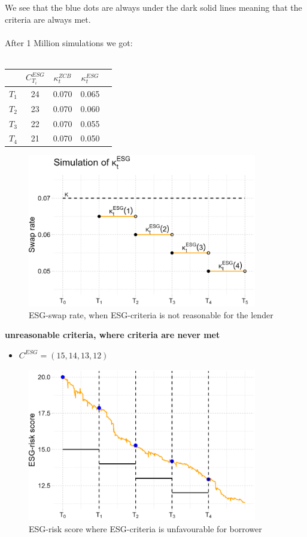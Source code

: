 We see that the blue dots are always under the dark solid lines meaning that the criteria are always met.
\\~\\ 
After 1 Million simulations we got:
\\~\\
\begin{tabular}{lcccl}
\toprule
           &$C_{T_{i}}^{ESG}$ & $\kappa_{t}^{ZCB}$  & $\kappa_{t}^{ESG}$ \\
\midrule
$T_{1}$ &  24 & 0.070 & 0.065 \\
$T_{2}$ &  23 & 0.070 & 0.060 \\
$T_{3}$ &  22 & 0.070 & 0.055 \\
$T_{4}$ &  21 & 0.070 & 0.050 \\
\bottomrule
\end{tabular}

\begin{figure}[htp]
    \centering
    \includegraphics[width= 10cm]{figures/ESG/kappa_t_ESG_2.png}
    \caption{ESG-swap rate, when ESG-criteria is not reasonable for the lender}
    \label{fig: ESG_swap_2}
\end{figure}

\newpage 
\textbf{unreasonable criteria, where criteria are never met}
\begin{itemize}
    \item $C^{ESG} = (15, 14, 13, 12)$
\end{itemize}

\begin{figure}[htp]
    \centering
    \includegraphics[width= 10cm]{figures/ESG/ESG_plt_criteria3.png}
    \caption{ESG-risk score where ESG-criteria is unfavourable for borrower}
    \label{fig: ESG_risk_criteria_3}
\end{figure} 

